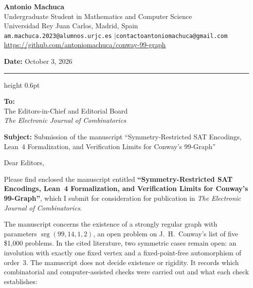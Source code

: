\documentclass[10pt,a4paper]{article}
\begin{document}
\begin{minipage}[t]{0.72\textwidth}
  {\large\textbf{Antonio Machuca}} \\[1.5pt]
  Undergraduate Student in Mathematics and Computer Science \\
  Universidad Rey Juan Carlos, Madrid, Spain \\[1.5pt]
  {\small\texttt{am.machuca.2023@alumnos.urjc.es} \enspace$|$\enspace \texttt{contactoantoniomachuca@gmail.com}} \\
  \url{https://github.com/antoniomachuca/conway-99-graph}
\end{minipage}
\hfill
\begin{minipage}[t]{0.26\textwidth}
  \raggedleft
  \textbf{Date:} October 3, 2026
\end{minipage}

\vspace{0.4em}
\hrule height 0.6pt
\vspace{0.4em}

\textbf{To:} \\
The Editors-in-Chief and Editorial Board \\
\textit{The Electronic Journal of Combinatorics}

\vspace{0.4em}
\textbf{Subject:} Submission of the manuscript ``Symmetry-Restricted SAT Encodings, Lean~4 Formalization, and Verification Limits for Conway's 99-Graph''
\vspace{0.4em}

Dear Editors,

Please find enclosed the manuscript entitled \textbf{``Symmetry-Restricted SAT Encodings, Lean~4 Formalization, and Verification Limits for Conway's 99-Graph''}, which I submit for consideration for publication in \textit{The Electronic Journal of Combinatorics}.

The manuscript concerns the existence of a strongly regular graph with parameters $\operatorname{srg}(99, 14, 1, 2)$, an open problem on J.~H.~Conway's list of five \$1{,}000 problems. In the cited literature, two symmetric cases remain open: an involution with exactly one fixed vertex and a fixed-point-free automorphism of order~3. The manuscript does not decide existence or rigidity. It records which combinatorial and computer-assisted checks were carried out and what each check establishes:
\end{document}

